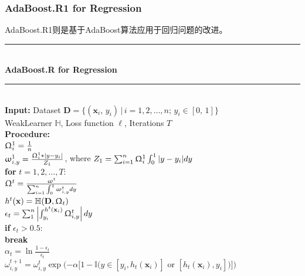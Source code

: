 \documentclass[a4paper]{article}
\begin{document}
		\subsubsection{AdaBoost.R1 for Regression}
			AdaBoost.R1则是基于AdaBoost算法应用于回归问题的改进。\\
			\noindent\rule[0.1\baselineskip]{\textwidth}{0.75pt}\\
			\textbf{AdaBoost.R for Regression}\\
			\noindent\rule[0.1\baselineskip]{\textwidth}{0.75pt}\\
			\textbf{Input:}	Dataset $\textbf{D} = \{(\textbf{x}_i,\,y_i)\,|\,i = 1, 2,\dots, n;\, y_i \in [0,\,1]\}$\\
			\hspace*{32pt}	WeakLearner $\mathbb{H}$, Loss function $\ell$, Iterations $T$\\
			\textbf{Procedure:}\\ 
			    \hspace*{32pt}	$\Upomega^1_i = \frac{1}{n}$\\
			    \hspace*{32pt}	$\upomega_{i,y}^1 = \frac{\Upomega^1_i*|y-y_i|}{Z_1}$, where $Z_1 = \sum_{i=1}^{n}\Upomega^1_i\int_{0}^{1}|y-y_i|dy$\\
			    \hspace*{32pt}	\textbf{for} $t = 1, 2,\dots, T$:\\
			        \hspace*{48pt}	$\Upomega^t = \frac{\upomega^t}{\sum_{i=1}^{n}\int_{0}^{1}\upomega_{i,y}^tdy}$\\
			        \hspace*{48pt}	$h^t(\textbf{x}) = \mathbb{H}(\textbf{D}, \Upomega_t)$\\
			        \hspace*{48pt}	$\epsilon_t = \sum_{1}^{n}\left|\int_{y_i}^{h^t(\textbf{x}_i)}\Upomega_{i,y}^{t}\right|dy$\\
			        \hspace*{48pt}	\textbf{if} $\epsilon_t > 0.5$:\\
			        \hspace*{64pt}	\textbf{break}\\
			        \hspace*{48pt}	$\alpha_t = \ln\frac{1-\epsilon_t}{\epsilon_t}$\\
			        \hspace*{48pt}	$\omega_{i,y}^{t+1} = \omega_{i,y}^{t}\exp(-\alpha[1-\mathbb{I}(y\in[y_i, h_t(\textbf{x}_i)]$ or $[h_t(\textbf{x}_i),y_i])]) $\\
\end{document}
